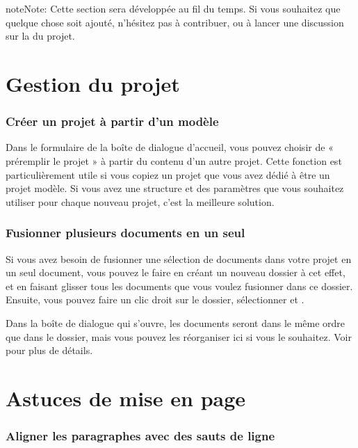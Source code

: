 \documentclass[a4paper,11pt,french]{sphinxmanual}
\begin{document}
\begin{sphinxadmonition}{note}{Note:}
\sphinxAtStartPar
Cette section sera développée au fil du temps. Si vous souhaitez que quelque chose soit ajouté, n’hésitez pas à contribuer, ou à lancer une discussion sur la  du projet.
\end{sphinxadmonition}


\section{Gestion du projet}
\label{\detokenize{int_howto:managing-the-project}}\subsubsection*{Créer un projet à partir d’un modèle}

\sphinxAtStartPar
Dans le formulaire  de la boîte de dialogue d’accueil, vous pouvez choisir de « pré\sphinxhyphen{}remplir le projet » à partir du contenu d’un autre projet. Cette fonction est particulièrement utile si vous copiez un projet que vous avez dédié à être un projet modèle. Si vous avez une structure et des paramètres que vous souhaitez utiliser pour chaque nouveau projet, c’est la meilleure solution.
\subsubsection*{Fusionner plusieurs documents en un seul}

\sphinxAtStartPar
Si vous avez besoin de fusionner une sélection de documents dans votre projet en un seul document, vous pouvez le faire en créant un nouveau dossier à cet effet, et en faisant glisser tous les documents que vous voulez fusionner dans ce dossier. Ensuite, vous pouvez faire un clic droit sur le dossier, sélectionner  et .

\sphinxAtStartPar
Dans la boîte de dialogue qui s’ouvre, les documents seront dans le même ordre que dans le dossier, mais vous pouvez les réorganiser ici si vous le souhaitez. Voir {\hyperref[\detokenize{usage_project:a-ui-tree-split-merge}]{}} pour plus de détails.


\section{Astuces de mise en page}
\label{\detokenize{int_howto:layout-tricks}}\subsubsection*{Aligner les paragraphes avec des sauts de ligne}
\end{document}
